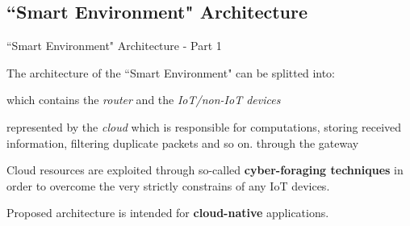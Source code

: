 \documentclass[10pt]{beamer}
\begin{document}
\subsection{``Smart Environment" Architecture}
\begin{frame}{``Smart Environment" Architecture - Part 1}

The architecture of the ``Smart Environment"  can be splitted into:

\begin{description}
\justifying
\item[\textbf{Front-end}] which contains the \textit{router} and the \textit{IoT/non-IoT devices}

\item[\textbf{Back-end}] represented by the \textit{cloud} which is responsible for computations, storing received information, filtering duplicate packets and so on.
through the gateway

\end{description}

\begin{block}{}
\justifying
Cloud resources are exploited through so-called \textbf{cyber-foraging techniques} in order to overcome the very strictly constrains of any IoT devices.
\end{block}

\begin{block}{}
\justifying
Proposed architecture is intended for \textbf{cloud-native} applications.
\end{block}

\end{frame} 
\end{document}
